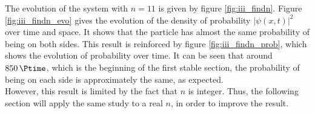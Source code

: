 \documentclass[a4paper,12pt,twoside]{article}
\newcommand{\abs}[1]{\left|#1\right|}
\begin{document}
      The evolution of the system with $n=11$ is given by figure \ref{fig:iii_findn}.
      Figure \ref{fig:iii_findn_evo} gives the evolution of the density of probability $\abs{\psi(x,t)}^2$ over time and space.
      It shows that the particle has almost the same probability of being on both sides.
      This result is reinforced by figure \ref{fig:iii_findn_prob}, which shows the evolution of probability over time.
      It can be seen that around $\SI{850}{\Ptime}$, which is the beginning of the first stable section, the probability of being on each side is approximately the same, as expected.\\

      However, this result is limited by the fact that $n$ is integer.
      Thus, the following section will apply the same study to a real $n$, in order to improve the result.\\
\end{document}
